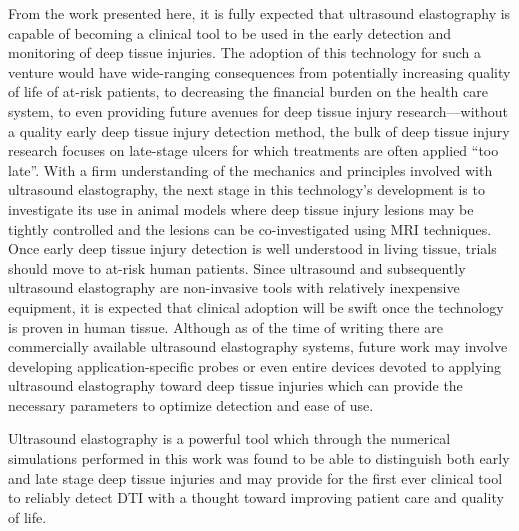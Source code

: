 		From the work presented here, it is fully expected that ultrasound elastography is capable of becoming a clinical tool to be used in the early detection and monitoring of deep tissue injuries. The adoption of this technology for such a venture would have wide-ranging consequences from potentially increasing quality of life of at-risk patients, to decreasing the financial burden on the health care system, to even providing future avenues for deep tissue injury research---without a quality early deep tissue injury detection method, the bulk of deep tissue injury research focuses on late-stage ulcers for which treatments are often applied ``too late''. With a firm understanding of the mechanics and principles involved with ultrasound elastography, the next stage in this technology's development is to investigate its use in animal models where deep tissue injury lesions may be tightly controlled and the lesions can be co-investigated using MRI techniques. Once early deep tissue injury detection is well understood in living tissue, trials should move to at-risk human patients. Since ultrasound and subsequently ultrasound elastography are non-invasive tools with relatively inexpensive equipment, it is expected that clinical adoption will be swift once the technology is proven in human tissue. Although as of the time of writing there are commercially available ultrasound elastography systems, future work may involve developing application-specific probes or even entire devices devoted to applying ultrasound elastography toward deep tissue injuries which can provide the necessary parameters to optimize detection and ease of use.

		Ultrasound elastography is a powerful tool which through the numerical simulations performed in this work was found to be able to distinguish both early and late stage deep tissue injuries and may provide for the first ever clinical tool to reliably detect DTI with a thought toward improving patient care and quality of life.

